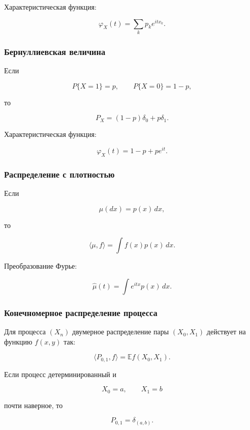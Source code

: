 \documentclass[
  11pt,
  a4paper,
]{article}
\begin{document}
Характеристическая функция:

\[
\varphi_X(t)=\sum_kp_ke^{itx_k}.
\]

\subsubsection{Бернуллиевская
величина}\label{ux431ux435ux440ux43dux443ux43bux43bux438ux435ux432ux441ux43aux430ux44f-ux432ux435ux43bux438ux447ux438ux43dux430}

Если

\[
P\{X=1\}=p,
\qquad
P\{X=0\}=1-p,
\]

то

\[
P_X=(1-p)\delta_0+p\delta_1.
\]

Характеристическая функция:

\[
\varphi_X(t)=1-p+pe^{it}.
\]

\subsubsection{Распределение с
плотностью}\label{ux440ux430ux441ux43fux440ux435ux434ux435ux43bux435ux43dux438ux435-ux441-ux43fux43bux43eux442ux43dux43eux441ux442ux44cux44e}

Если

\[
\mu(dx)=p(x)\,dx,
\]

то

\[
\langle\mu,f\rangle=\int f(x)p(x)\,dx.
\]

Преобразование Фурье:

\[
\widehat\mu(t)=\int e^{itx}p(x)\,dx.
\]

\subsubsection{Конечномерное распределение
процесса}\label{ux43aux43eux43dux435ux447ux43dux43eux43cux435ux440ux43dux43eux435-ux440ux430ux441ux43fux440ux435ux434ux435ux43bux435ux43dux438ux435-ux43fux440ux43eux446ux435ux441ux441ux430-1}

Для процесса \((X_n)\) двумерное распределение пары \((X_0,X_1)\)
действует на функцию \(f(x,y)\) так:

\[
\langle P_{0,1},f\rangle
=
\mathbb E f(X_0,X_1).
\]

Если процесс детерминированный и

\[
X_0=a,\qquad X_1=b
\]

почти наверное, то

\[
P_{0,1}=\delta_{(a,b)}.
\]
\end{document}
